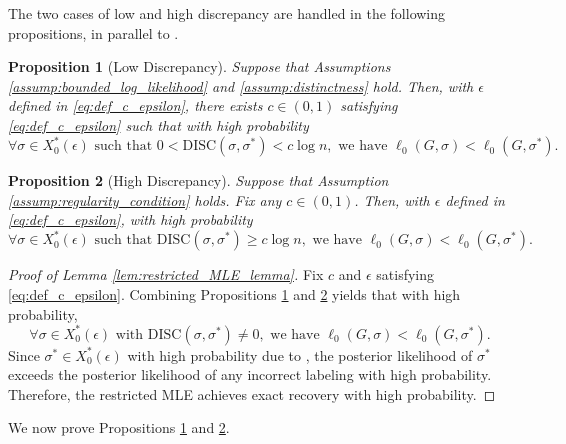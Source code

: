 \documentclass{article}
\newcommand{\1}{\mathbbm{1}}
\theoremstyle{definition}
\theoremstyle{plain}
\newtheorem{prop}{Proposition}
\begin{document}
The two cases of low and high discrepancy are handled in the following propositions, in parallel to \cite[Propositions D.5 and D.6]{Gaudio+2025}.
\begin{prop}[Low Discrepancy]
\label{prop:low_discrepancy}
    Suppose that Assumptions \ref{assump:bounded_log_likelihood} and \ref{assump:distinctness} hold. Then, with $\epsilon$ defined in \eqref{eq:def_c_epsilon}, there exists $c \in (0, 1)$ satisfying \eqref{eq:def_c_epsilon} such that with high probability
    \begin{equation*}
        \forall \sigma \in X_0^*(\epsilon) \text{ such that } 0 < \mathrm{DISC}(\sigma, \sigma^*) < c \log n, \text{ we have } \ell_0(G, \sigma) < \ell_0(G, \sigma^*).
    \end{equation*}
\end{prop}

\begin{prop}[High Discrepancy]
\label{prop:high_discrepancy}
    Suppose that Assumption \ref{assump:regularity_condition} holds. Fix any $c \in (0, 1)$. Then, with $\epsilon$ defined in \eqref{eq:def_c_epsilon}, with high probability
    \begin{equation*}
        \forall \sigma \in X_0^*(\epsilon) \text{ such that } \mathrm{DISC}(\sigma, \sigma^*) \geq c \log n, \text{ we have } \ell_0(G, \sigma) < \ell_0(G, \sigma^*).
    \end{equation*}
\end{prop}

\begin{proof}[Proof of Lemma \ref{lem:restricted_MLE_lemma}]
    Fix $c$ and $\epsilon$ satisfying \eqref{eq:def_c_epsilon}. Combining Propositions \ref{prop:low_discrepancy} and \ref{prop:high_discrepancy} yields that with high probability,
    \begin{equation*}
        \forall \sigma \in X_0^*(\epsilon) \text{ with } \mathrm{DISC}(\sigma, \sigma^*) \neq 0, \text{ we have } \ell_0(G, \sigma) < \ell_0(G, \sigma^*).
    \end{equation*}
    Since $\sigma^* \in X_0^*(\epsilon)$ with high probability due to \cite[Lemma D.3]{Gaudio+2025}, the posterior likelihood of $\sigma^*$ exceeds the posterior likelihood of any incorrect labeling with high probability. Therefore, the restricted MLE achieves exact recovery with high probability.
\end{proof}

We now prove Propositions \ref{prop:low_discrepancy} and \ref{prop:high_discrepancy}.
\end{document}
